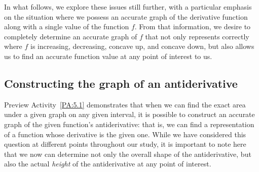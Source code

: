 In what follows, we explore these issues still further, with a particular emphasis on the situation where we possess an accurate graph of the derivative function along with a single value of the function $f$.  From that information, we desire to completely determine an accurate graph of $f$ that not only represents correctly where $f$ is increasing, decreasing, concave up, and concave down, but also allows us to find an accurate function value at any point of interest to us.



\subsection*{Constructing the graph of an antiderivative}

Preview Activity~\ref{PA:5.1} demonstrates that when we can find the exact area under a given graph on any given interval, it is possible to construct an accurate graph of the given function's antiderivative: that is, we can find a representation of a function whose derivative is the given one.  While we have considered this question at different points throughout our study, it is important to note here that we now can determine not only the overall shape of the antiderivative, but also the actual \emph{height} of the antiderivative at any point of interest.

